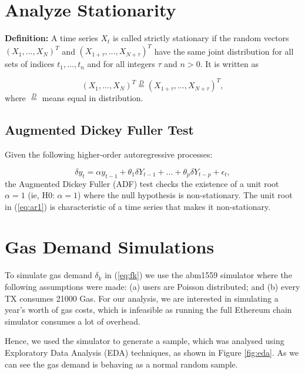 \documentclass[peerreview]{ieeesyscoin}
\begin{document}
\section{Analyze Stationarity}
\label{section:analyze_stationarity}

\textbf{Definition:} A time series ${X_{t}}$ is called strictly stationary if the random vectors $(X_{1} , ... , X_{N} )^T$ and $(X_{1+\tau} , ... , X_{N+\tau} )^T$ have the same joint distribution for all sets of indices ${t_{1} , ... , t_{n}}$ and for all integers $\tau$ and $n > 0$. It is written as 

 \begin{equation}
(X_{1} , ... , X_{N} )^T \stackrel{D}{=} (X_{1+\tau} , ... , X_{N+\tau} )^T,
\label{eq:ar1} \tag{3}
\end{equation}
where $\stackrel{D}{=}$ means equal in distribution.

\subsection{Augmented Dickey Fuller Test}
\label{section:adf}

Given the following higher-order autoregressive processes:

\begin{equation}
\delta y_{t} = \alpha y_{t-1} + \theta_{1} \delta Y_{t-1}  + ... + \theta_{p} \delta Y_{t-p} + \epsilon_{t},
\label{eq:ar1} \tag{4}
\end{equation}
the Augmented Dickey Fuller (ADF) test checks the existence of a unit root $\alpha = 1$ (ie, H0: $\alpha = 1$) where the null hypothesis is non-stationary. The unit root in (\ref{eq:ar1}) is characteristic of a time series that makes it non-stationary.

\section{Gas Demand Simulations}
\label{section:gas_demand}

To simulate gas demand $\delta_{k}$ in (\ref{eq:fk}) we use the abm1559 simulator \cite{Mon21} where the following assumptions were made: (a) users are Poisson distributed; and (b) every TX consumes 21000 Gas. For our analysis, we are interested in simulating a year's worth of gas costs, which is infeasible as running the full Ethereum chain simulator consumes a lot of overhead.

Hence, we used the simulator to generate a sample, which was analysed using Exploratory Data Analysis (EDA) techniques, as shown in Figure \ref{fig:eda}. As we can see the gas demand is behaving as a normal random sample. 
\end{document}
